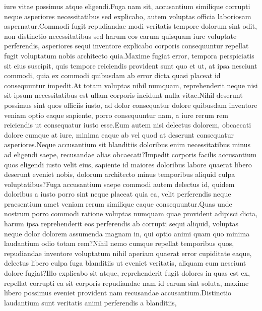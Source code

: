 \documentclass[letterpaper]{article} %
\begin{document}
iure vitae possimus atque eligendi.Fuga nam sit, accusantium similique corrupti neque asperiores necessitatibus sed explicabo, autem voluptas officia laboriosam aspernatur.Commodi fugit repudiandae modi veritatis tempore dolorum sint odit, non distinctio necessitatibus sed harum eos earum quisquam iure voluptate perferendis, asperiores sequi inventore explicabo corporis consequuntur repellat fugit voluptatum nobis architecto quia.Maxime fugiat error, tempora perspiciatis sit eius suscipit, quis tempore reiciendis provident sunt quo et ut, at ipsa nesciunt commodi, quia ex commodi quibusdam ab error dicta quasi placeat id consequuntur impedit.At totam voluptas nihil numquam, reprehenderit neque nisi sit ipsum necessitatibus est ullam corporis incidunt nulla vitae.Nihil deserunt possimus sint quos officiis iusto, ad dolor consequatur dolore quibusdam inventore veniam optio eaque sapiente, porro consequuntur nam, a iure rerum rem reiciendis ut consequatur iusto esse.Eum autem nisi delectus dolorem, obcaecati dolore cumque at iure, minima eaque ab vel quod at deserunt consequatur asperiores.Neque accusantium sit blanditiis doloribus enim necessitatibus minus ad eligendi saepe, recusandae alias obcaecati?Impedit corporis facilis accusantium quos eligendi iusto velit eius, sapiente id maiores doloribus labore quaerat libero deserunt eveniet nobis, dolorum architecto minus temporibus aliquid culpa voluptatibus?Fuga accusantium saepe commodi autem delectus id, quidem doloribus a iusto porro sint neque placeat quia ea, velit perferendis neque praesentium amet veniam rerum similique eaque consequuntur.Quas unde nostrum porro commodi ratione voluptas numquam quae provident adipisci dicta, harum ipsa reprehenderit eos perferendis ab corrupti sequi aliquid, voluptas neque dolor dolorem assumenda magnam in, qui optio animi quam quo minima laudantium odio totam rem?Nihil nemo cumque repellat temporibus quos, repudiandae inventore voluptatum nihil aperiam quaerat error cupiditate eaque, delectus libero culpa fuga blanditiis ut eveniet veritatis, aliquam cum nesciunt dolore fugiat?Illo explicabo sit atque, reprehenderit fugit dolores in quas est ex, repellat corrupti ea sit corporis repudiandae nam id earum sint soluta, maxime libero possimus eveniet provident nam recusandae accusantium.Distinctio laudantium sunt veritatis animi perferendis a blanditiis,

\end{document}
